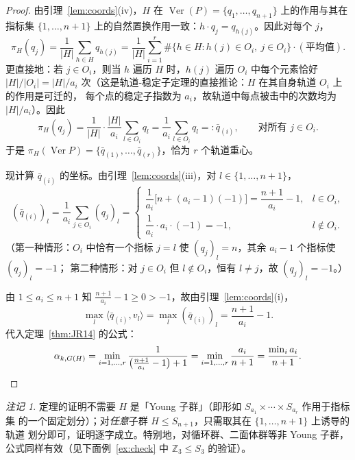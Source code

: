 \documentclass[11pt,a4paper]{article}
\theoremstyle{definition}
\theoremstyle{remark}
\newtheorem{remark}[theorem]{注记}
\DeclareMathOperator{\Ver}{Ver}
\begin{document}
\begin{proof}
由引理~\ref{lem:coords}(iv)，$H$ 在 $\Ver(P) = \{q_1,\dots,q_{n+1}\}$ 上的作用与其在指标集
$\{1,\dots,n+1\}$ 上的自然置换作用一致：$h \cdot q_j = q_{h(j)}$。因此对每个 $j$，
\[
  \pi_H(q_j) = \frac{1}{|H|}\sum_{h \in H} q_{h(j)}
  = \frac{1}{|H|} \sum_{i=1}^{r} \#\{h \in H : h(j) \in O_i,\ j \in O_i\} \cdot (\text{平均值}).
\]
更直接地：若 $j \in O_i$，则当 $h$ 遍历 $H$ 时，$h(j)$ 遍历 $O_i$ 中每个元素恰好
$|H|/|O_i| = |H|/a_i$ 次（这是轨道-稳定子定理的直接推论：$H$ 在其自身轨道 $O_i$ 上的作用是可迁的，
每个点的稳定子指数为 $a_i$，故轨道中每点被击中的次数均为 $|H|/a_i$）。因此
\[
  \pi_H(q_j) = \frac{1}{|H|}\cdot \frac{|H|}{a_i} \sum_{l \in O_i} q_l
  = \frac{1}{a_i}\sum_{l \in O_i} q_l =: \bar q_{(i)}, \qquad \text{对所有 } j \in O_i.
\]
于是 $\pi_H(\Ver P) = \{\bar q_{(1)},\dots,\bar q_{(r)}\}$，恰为 $r$ 个轨道重心。

现计算 $\bar q_{(i)}$ 的坐标。由引理~\ref{lem:coords}(iii)，对 $l \in \{1,\dots,n+1\}$，
\[
  (\bar q_{(i)})_l = \frac{1}{a_i} \sum_{j \in O_i} (q_j)_l
  = \begin{cases}
      \dfrac{1}{a_i}\big[n + (a_i - 1)(-1)\big] = \dfrac{n+1}{a_i} - 1, & l \in O_i,\\[1.2em]
      \dfrac{1}{a_i}\cdot a_i \cdot(-1) = -1, & l \notin O_i.
    \end{cases}
\]
（第一种情形：$O_i$ 中恰有一个指标 $j=l$ 使 $(q_j)_l = n$，其余 $a_i - 1$ 个指标使 $(q_j)_l=-1$；
第二种情形：对 $j \in O_i$ 但 $l \notin O_i$，恒有 $l \ne j$，故 $(q_j)_l = -1$。）

由 $1 \le a_i \le n+1$ 知 $\frac{n+1}{a_i} - 1 \ge 0 > -1$，故由引理~\ref{lem:coords}(i)，
\[
  \max_{l} \langle \bar q_{(i)}, v_l \rangle = \max_l (\bar q_{(i)})_l = \frac{n+1}{a_i} - 1.
\]
代入定理~\ref{thm:JR14} 的公式：
\[
  \alpha_{k,G(H)} = \min_{i=1,\dots,r} \frac{1}{\big(\frac{n+1}{a_i}-1\big)+1}
  = \min_{i=1,\dots,r} \frac{a_i}{n+1} = \frac{\min_i a_i}{n+1}. \qedhere
\]
\end{proof}

\begin{remark}
定理的证明不需要 $H$ 是「Young 子群」（即形如 $S_{a_1}\times\cdots\times S_{a_r}$ 作用于指标集
的一个固定划分）；对\emph{任意}子群 $H \le S_{n+1}$，只需取其在 $\{1,\dots,n+1\}$ 上诱导的轨道
划分即可，证明逐字成立。特别地，对循环群、二面体群等非 Young 子群，公式同样有效（见下面例~\ref{ex:check}
中 $\mathbb{Z}_3 \le S_3$ 的验证）。
\end{remark}
\end{document}
